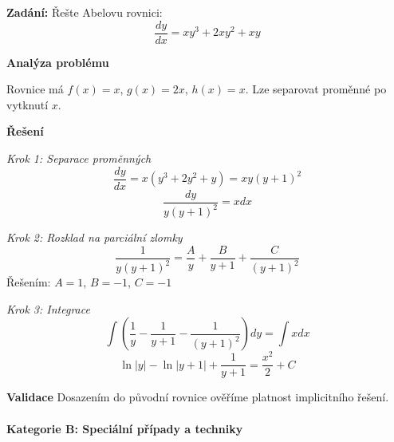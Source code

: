 \begin{example}
\label{ex:abel-linearni}

\noindent\textbf{Zadání:} Řešte Abelovu rovnici:
\[
\frac{dy}{dx} = xy^3 + 2xy^2 + xy
\]

\vspace{1.5\baselineskip}

\noindent\textbf{Analýza problému}

Rovnice má $f(x) = x$, $g(x) = 2x$, $h(x) = x$. Lze separovat proměnné po vytknutí $x$.

\vspace{1.5\baselineskip}

\noindent\textbf{Řešení}

\noindent\textit{Krok 1: Separace proměnných}
\[
\frac{dy}{dx} = x(y^3 + 2y^2 + y) = xy(y+1)^2
\]
\[
\frac{dy}{y(y+1)^2} = x dx
\]

\vspace{1\baselineskip}

\noindent\textit{Krok 2: Rozklad na parciální zlomky}
\[
\frac{1}{y(y+1)^2} = \frac{A}{y} + \frac{B}{y+1} + \frac{C}{(y+1)^2}
\]
Řešením: $A = 1$, $B = -1$, $C = -1$

\vspace{1\baselineskip}

\noindent\textit{Krok 3: Integrace}
\[
\int \left(\frac{1}{y} - \frac{1}{y+1} - \frac{1}{(y+1)^2}\right) dy = \int x dx
\]
\[
\ln|y| - \ln|y+1| + \frac{1}{y+1} = \frac{x^2}{2} + C
\]

\vspace{1.5\baselineskip}

\noindent\textbf{Validace}
Dosazením do původní rovnice ověříme platnost implicitního řešení.

\end{example}

\paragraph*{Kategorie B: Speciální případy a techniky}

